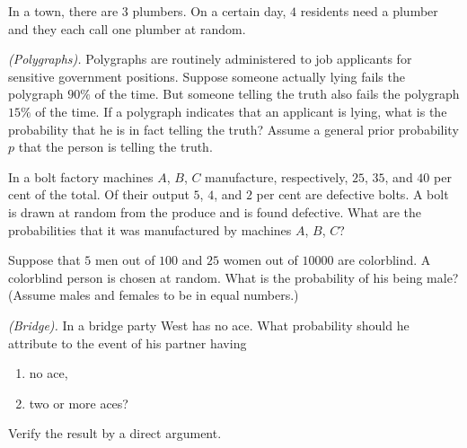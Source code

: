 \begin{problem}[Handout 3, \# 5]
  In a town, there are \(3\) plumbers. On a certain day, \(4\) residents
  need a plumber and they each call one plumber at random.
\end{problem}
\begin{solution}

\end{solution}
\newpage

\begin{problem}[Handout 4, \# 7]
  \emph{(Polygraphs).} Polygraphs are routinely administered to job
  applicants for sensitive government positions. Suppose someone actually
  lying fails the polygraph \(90\%\) of the time. But someone telling the
  truth also fails the polygraph \(15\%\) of the time. If a polygraph
  indicates that an applicant is lying, what is the probability that he is
  in fact telling the truth? Assume a general prior probability \(p\) that
  the person is telling the truth.
\end{problem}
\begin{solution}

\end{solution}
\newpage

\begin{problem}[Handout 4, \# 8]
  In a bolt factory machines \(A\), \(B\), \(C\) manufacture, respectively,
  \(25\), \(35\), and \(40\) per cent of the total. Of their output \(5\),
  \(4\), and \(2\) per cent are defective bolts. A bolt is drawn at random
  from the produce and is found defective. What are the probabilities that
  it was manufactured by machines \(A\), \(B\), \(C\)?
\end{problem}
\begin{solution}

\end{solution}
\newpage

\begin{problem}[Handout 4, \# 9]
  Suppose that \(5\) men out of \(100\) and \(25\) women out of
  \(\num{10000}\) are colorblind. A colorblind person is chosen at
  random. What is the probability of his being male? (Assume males and
  females to be in equal numbers.)
\end{problem}
\begin{solution}

\end{solution}
\newpage

\begin{problem}[Handout 4, \# 10]
  \emph{(Bridge).} In a bridge party West has no ace. What probability should
  he attribute to the event of his partner having
  \begin{enumerate}[label=(\alph*),noitemsep]
  \item no ace,
  \item two or more aces?
  \end{enumerate}
  Verify the result by a direct argument.
\end{problem}
\begin{solution}

\end{solution}
\newpage


